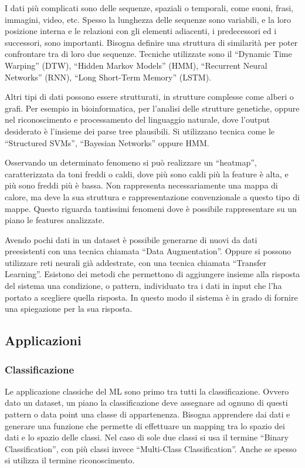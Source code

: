 \documentclass{article}
\numberwithin{equation}{subsection}
\begin{document}
I dati più complicati sono delle sequenze, spaziali o temporali, come suoni, frasi, immagini, video, etc. Spesso la lunghezza delle sequenze sono variabili, e la loro posizione 
interna e le relazioni con gli elementi adiacenti, i predecessori ed i successori, sono importanti. 
Bisogna definire una struttura di similarità per poter confrontare tra di loro due sequenze. Tecniche utilizzate sono il ``Dynamic Time Warping'' (DTW), ``Hidden Markov Models'' (HMM), 
``Recurrent Neural Networks'' (RNN), ``Long Short-Term Memory'' (LSTM). 

Altri tipi di dati possono essere strutturati, in strutture complesse come alberi o grafi. Per esempio in bioinformatica, per l'analisi delle strutture genetiche, oppure nel riconoscimento e processamento del linguaggio naturale, dove l'output desiderato è l'insieme dei parse tree plausibili. Si utilizzano tecnica come le ``Structured SVMs'', ``Bayesian Networks'' oppure HMM. 


Osservando un determinato fenomeno si può realizzare un ``heatmap'', caratterizzata da 
toni freddi o caldi, dove più sono caldi più la feature è alta, e più sono freddi più è 
bassa. Non rappresenta necessariamente una mappa di calore, ma deve la sua struttura e 
rappresentazione convenzionale a questo tipo di mappe. Questo riguarda tantissimi 
fenomeni dove è possibile rappresentare su un piano le features analizzate. 


Avendo pochi dati in un dataset è possibile generarne di nuovi da dati preesistenti con una tecnica chiamata ``Data Augmentation''. Oppure si possono utilizzare reti neurali già 
addestrate, con una tecnica chiamata ``Transfer Learning''. Esistono dei metodi che permettono di aggiungere insieme alla risposta del sistema una condizione, o pattern, individuato tra i dati in input che l'ha portato a scegliere quella risposta. In questo modo il sistema è in grado di fornire una spiegazione per la sua risposta. 

\subsection{Applicazioni}

\subsubsection{Classificazione}

Le applicazione classiche del ML sono primo tra tutti la classificazione. Ovvero dato un dataset, un piano la classificazione deve assegnare ad ognuno di questi pattern o data point 
una classe di appartenenza. Bisogna apprendere dai dati e generare una funzione che permette di effettuare un mapping tra lo spazio dei dati e lo spazio delle classi. Nel caso di sole due classi si usa il termine ``Binary Classification'', con più classi invece ``Multi-Class Classification''. Anche se spesso si utilizza il termine riconoscimento. 
\end{document}
